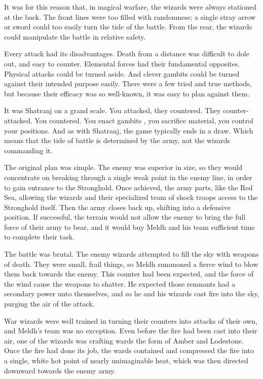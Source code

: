 It was for this reason that, in magical warfare, the wizards were always stationed at the back. The front lines were too filled with randomness; a single stray arrow or sword could too easily turn the tide of the battle. From the rear, the wizards could manipulate the battle in relative safety.

Every attack had its disadvantages. Death from a distance was difficult to dole out, and easy to counter. Elemental forces had their fundamental opposites. Physical attacks could be turned aside. And clever gambits could be turned against their intended purpose easily. There were a few tried and true methods, but because their efficacy was so well-known, it was easy to plan against them.

It was Shatranj on a grand scale. You attacked, they countered. They counter-attacked. You countered. You enact gambits , you sacrifice material, you control your positions. And as with Shatranj, the game typically ends in a draw. Which means that the tide of battle is determined by the army, not the wizards commanding it.

The original plan was simple. The enemy was superior in size, so they would concentrate on breaking through a single weak point in the enemy line, in order to gain entrance to the Stronghold. Once achieved, the army parts, like the Red Sea, allowing the wizards and their specialized team of shock troops access to the Stronghold itself. Then the army closes back up, shifting into a defensive position. If successful, the terrain would not allow the enemy to bring the full force of their army to bear, and it would buy Meldh and his team sufficient time to complete their task.

The battle was brutal. The enemy wizards attempted to fill the sky with weapons of death. They were small, frail things, so Meldh summoned a fierce wind to blow them back towards the enemy. This counter had been expected, and the force of the wind cause the weapons to shatter. He expected those remnants had a secondary power unto themselves, and so he and his wizards cast fire into the sky, purging the air of the attack.

War wizards were well trained in turning their counters into attacks of their own, and Meldh’s team was no exception. Even before the fire had been cast into their air, one of the wizards was crafting wards the form of Amber and Lodestone. Once the fire had done its job, the wards contained and compressed the fire into a single, white hot point of nearly unimaginable heat, which was then directed downward towards the enemy army.


